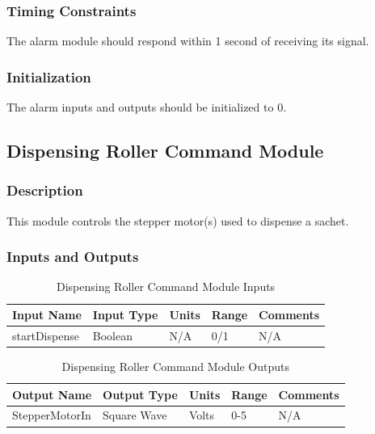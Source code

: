 \documentclass[12pt,titlepage]{article}
\begin{document}
\subsubsection*{Timing Constraints}
The alarm module should respond within 1 second of receiving its signal.
\subsubsection*{Initialization}
The alarm inputs and outputs should be initialized to 0.
\subsection{Dispensing Roller Command Module }
\subsubsection*{Description}
This module controls the stepper motor(s) used to dispense a sachet.
\subsubsection*{Inputs and Outputs}

\begin{table}[ht!]
\begin{center}
\begin{adjustbox}{max width=\textwidth}
\small
\begin{tabular}{|p{}|p{}|p{}|p{}|p{}|}
 \hline
 \textbf{Input Name} & \textbf{Input Type} & \textbf{Units} &\textbf{Range} & \textbf{Comments} \\
 \hline 
 startDispense & Boolean  & N/A & 0/1 & N/A \\
 \hline
\end{tabular}
\end{adjustbox}
\end{center}
\caption{Dispensing Roller Command Module Inputs}
\end{table}

\begin{table}[ht!]
\begin{center}
\begin{adjustbox}{max width=\textwidth}
\small
\begin{tabular}{|p{}|p{}|p{}|p{}|p{}|}
 \hline
 \textbf{Output Name} & \textbf{Output Type} & \textbf{Units} &\textbf{Range} & \textbf{Comments} \\
 \hline 
 StepperMotorIn & Square Wave & Volts & 0-5 & N/A \\
 \hline
\end{tabular}
\end{adjustbox}
\end{center}
\caption{Dispensing Roller Command Module Outputs}
\end{table}
\end{document}
